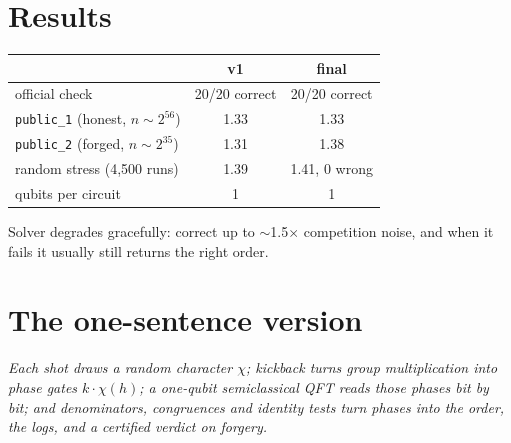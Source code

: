 \documentclass[11pt]{article}
\theoremstyle{plain}
\theoremstyle{definition}
\begin{document}
\section{Results}

\begin{center}
\begin{tabular}{lcc}
\toprule
 & v1 & final \\
\midrule
official check & 20/20 correct & 20/20 correct \\
\texttt{public\_1} (honest, $n\sim2^{56}$) & 1.33 & 1.33 \\
\texttt{public\_2} (forged, $n\sim2^{35}$) & 1.31 & 1.38 \\
random stress (4{,}500 runs) & 1.39 & 1.41, 0 wrong \\
qubits per circuit & 1 & 1 \\
\bottomrule
\end{tabular}
\end{center}

Solver degrades gracefully: correct up to $\sim$1.5$\times$ competition
noise, and when it fails it usually still returns the right order.

\section*{The one-sentence version}

\emph{Each shot draws a random character $\chi$; kickback turns group
multiplication into phase gates $k\cdot\chi(h)$; a one-qubit semiclassical
QFT reads those phases bit by bit; and denominators, congruences and
identity tests turn phases into the order, the logs, and a certified
verdict on forgery.}
\end{document}
